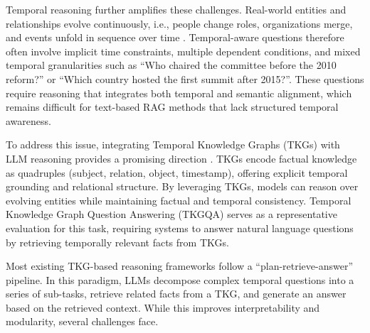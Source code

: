 Temporal reasoning further amplifies these challenges. 
Real-world entities and relationships evolve continuously, i.e., people change roles, organizations merge, and events unfold in sequence over time \cite{liang2023learn, ARI}. 
Temporal-aware questions therefore often involve implicit time constraints, multiple dependent conditions, and mixed temporal granularities such as “Who chaired the committee before the 2010 reform?” or “Which country hosted the first summit after 2015?”. 
These questions require reasoning that integrates both temporal and semantic alignment, which remains difficult for text-based RAG methods that lack structured temporal awareness.

To address this issue, integrating Temporal Knowledge Graphs (TKGs) with LLM reasoning provides a promising direction \cite{jia2024faithful,T4, ARI, khot2022decomposed, qianyihu-etal-2025-time}. 
TKGs encode factual knowledge as quadruples (subject, relation, object, timestamp), offering explicit temporal grounding and relational structure. 
By leveraging TKGs, models can reason over evolving entities while maintaining factual and temporal consistency. 
Temporal Knowledge Graph Question Answering (TKGQA) serves as a representative evaluation for this task, requiring systems to answer natural language questions by retrieving temporally relevant facts from TKGs.

Most existing TKG-based reasoning frameworks follow a ``plan-retrieve-answer'' pipeline. 
In this paradigm, LLMs decompose complex temporal questions into a series of sub-tasks, retrieve related facts from a TKG, and generate an answer based on the retrieved context. 
While this improves interpretability and modularity, several challenges face. 


